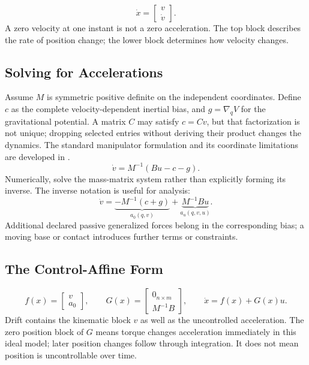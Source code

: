 \begin{equation}
 \dot x=\begin{bmatrix}v\\\dot v\end{bmatrix}.
\label{eq:ch05_state_derivative}
\end{equation}
A zero velocity at one instant is not a zero acceleration. The top block describes the rate of position change; the lower block determines how velocity changes.

\subsection*{Solving for Accelerations}
Assume $M$ is symmetric positive definite on the independent coordinates. Define $c$ as the complete velocity-dependent inertial bias, and $g=\nabla_q V$ for the gravitational potential. A matrix $C$ may satisfy $c=Cv$, but that factorization is not unique; dropping selected entries without deriving their product changes the dynamics. The standard manipulator formulation and its coordinate limitations are developed in \citep{TedrakeMultibodyEnergy}.
\begin{equation}
 \dot v=M^{-1}(Bu-c-g).
\label{eq:ch05_solve_accel}
\end{equation}
Numerically, solve the mass-matrix system rather than explicitly forming its inverse. The inverse notation is useful for analysis:
\begin{equation}
 \dot v=\underbrace{-M^{-1}(c+g)}_{a_0(q,v)}+
          \underbrace{M^{-1}Bu}_{a_u(q,v,u)}.
\label{eq:ch05_accel_decomposed}
\end{equation}
Additional declared passive generalized forces belong in the corresponding bias; a moving base or contact introduces further terms or constraints.

\subsection*{The Control-Affine Form}
\begin{equation}
 f(x)=\begin{bmatrix}v\\a_0\end{bmatrix},\qquad
 G(x)=\begin{bmatrix}0_{n\times m}\\M^{-1}B\end{bmatrix},\qquad
 \dot x=f(x)+G(x)u.
\label{eq:ch05_control_affine_form}
\end{equation}
Drift contains the kinematic block $v$ as well as the uncontrolled acceleration. The zero position block of $G$ means torque changes acceleration immediately in this ideal model; later position changes follow through integration. It does not mean position is uncontrollable over time.

